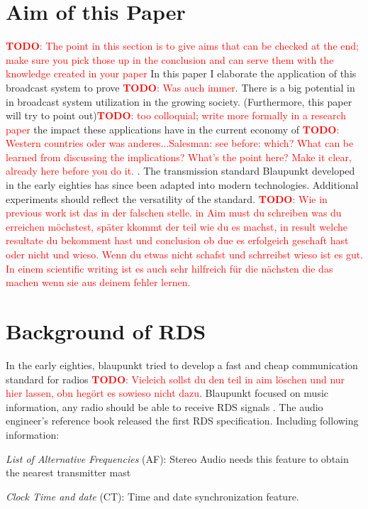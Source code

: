 \documentclass[conference,11pt,a4paper]{IEEEtran}
\newcommand{\todo}[1]{\textcolor{red}{\textbf{TODO}: #1}}
\begin{document}
	\section{Aim of this Paper}
	\todo{The point in this section is to give aims that can be checked at the end; make sure you pick those up in the conclusion and can serve them with the knowledge created in your paper}
	In this paper I elaborate the application of this broadcast system to prove \todo{Was auch immer}. There is a big potential in in broadcast system utilization in the growing society. (Furthermore, this paper will try to point out)\todo{too colloquial; write more formally in a research paper} the impact these applications have in the current economy of \todo{Western countries oder was anderes...Salesman: see before: which? What can be learned from discussing the implications? What's the point here? Make it clear, already here before you do it. }. The transmission standard Blaupunkt developed in the early eighties has since been adapted into modern technologies. Additional experiments should reflect the versatility of the standard. \todo{Wie in previous work ist das in der falschen stelle. in Aim must du schreiben was du erreichen möchstest, später kkommt der teil wie du es machst, in result welche resultate du bekomment hast und conclusion ob due es erfolgeich geschaft hast oder nicht und wieso. Wenn du etwas nicht schafst und schrreibst wieso ist es gut. In einem scientific writing ist es auch sehr hilfreich für die nächsten die das machen wenn sie aus deinem fehler lernen.}\\		

	\section{Background of RDS}
	In the early eighties, blaupunkt tried to develop a fast and cheap communication standard for radios \todo{Vieleich sollst du den teil in aim löschen und nur hier lassen, obn hegört es sowieso nicht dazu}. Blaupunkt focused on music information, any radio should be able to receive RDS signals \cite{DietmanRDSbeginning}. The audio engineer’s reference book released the first RDS specification\cite{firstRDSspecEBUTECH}. Including following information:
	
	\textit{List of Alternative Frequencies} (AF): Stereo Audio needs this feature to obtain the nearest transmitter mast
	
	\textit{Clock Time and date} (CT): Time and date synchronization feature.
	
\end{document}
